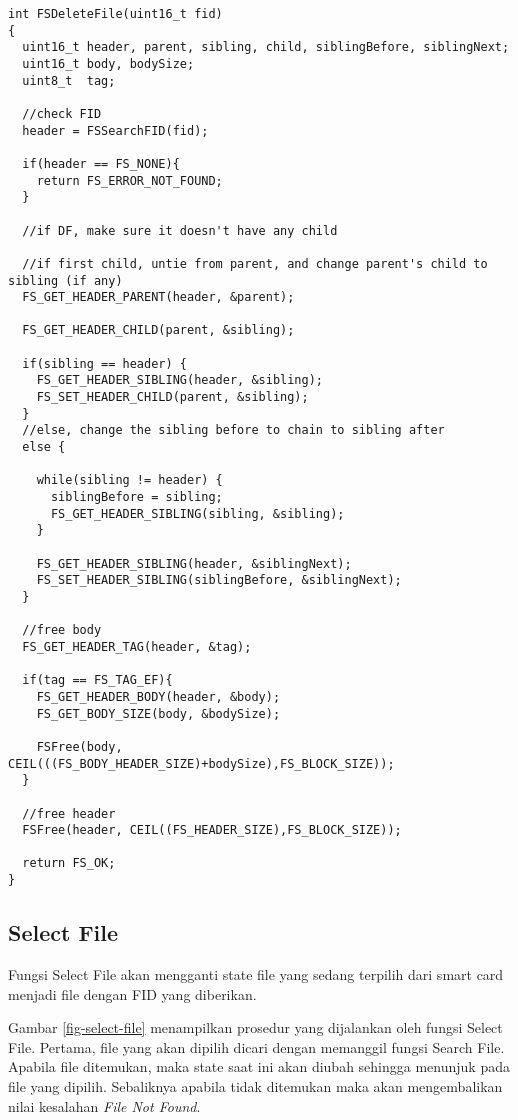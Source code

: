 \begin{lstlisting}[caption={Listing Program Fungsi FS Create File}, label={list-deletefile}]
int FSDeleteFile(uint16_t fid)
{
  uint16_t header, parent, sibling, child, siblingBefore, siblingNext;
  uint16_t body, bodySize;
  uint8_t  tag;

  //check FID
  header = FSSearchFID(fid);

  if(header == FS_NONE){
    return FS_ERROR_NOT_FOUND;
  }

  //if DF, make sure it doesn't have any child

  //if first child, untie from parent, and change parent's child to sibling (if any)
  FS_GET_HEADER_PARENT(header, &parent);

  FS_GET_HEADER_CHILD(parent, &sibling);

  if(sibling == header) {
    FS_GET_HEADER_SIBLING(header, &sibling);
    FS_SET_HEADER_CHILD(parent, &sibling);
  }
  //else, change the sibling before to chain to sibling after
  else {

    while(sibling != header) {
      siblingBefore = sibling;
      FS_GET_HEADER_SIBLING(sibling, &sibling);
    }

    FS_GET_HEADER_SIBLING(header, &siblingNext);
    FS_SET_HEADER_SIBLING(siblingBefore, &siblingNext);
  }

  //free body
  FS_GET_HEADER_TAG(header, &tag);

  if(tag == FS_TAG_EF){
    FS_GET_HEADER_BODY(header, &body);
    FS_GET_BODY_SIZE(body, &bodySize);

    FSFree(body, CEIL(((FS_BODY_HEADER_SIZE)+bodySize),FS_BLOCK_SIZE));
  }

  //free header
  FSFree(header, CEIL((FS_HEADER_SIZE),FS_BLOCK_SIZE));

  return FS_OK;
}
\end{lstlisting}

\subsection{Select File}

Fungsi Select File akan mengganti state file yang sedang terpilih dari smart card menjadi file dengan FID yang diberikan. 

Gambar \ref{fig-select-file} menampilkan prosedur yang dijalankan oleh fungsi Select File. Pertama, file yang akan dipilih dicari dengan memanggil fungsi Search File. Apabila file ditemukan, maka state saat ini akan diubah sehingga menunjuk pada file yang dipilih. Sebaliknya apabila tidak ditemukan maka akan mengembalikan nilai kesalahan {\em File Not Found}.

